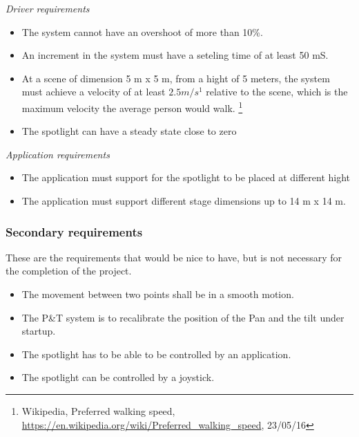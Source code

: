 \textit{Driver requirements}
\begin{itemize}
\item The system cannot have an overshoot of more than 10\%.

\item An increment in the system must have a seteling time of at least 50 mS. 

\item At a scene of dimension 5 m x 5 m, from a hight of 5 meters, the system must achieve a velocity of at least $2.5 m/s^{1}$ relative to the scene, which is the maximum velocity the average person would walk. 
\footnote{Wikipedia, Preferred walking speed, \url{https://en.wikipedia.org/wiki/Preferred_walking_speed}, 23/05/16}

\item The spotlight can have a steady state close to zero
\end{itemize}


\textit{Application requirements}
\begin{itemize}

\item The application must support for the spotlight to be placed at different hight

\item The application must support different stage dimensions up to 14 m x 14 m. 

\end{itemize}


\subsubsection{Secondary requirements}
These are the requirements that would be nice to have, but is not necessary for the completion of the project. 

\begin{itemize}
\item The movement between two points shall be in a smooth motion.

\item The P\&T system is to recalibrate the position of the Pan and the tilt under startup.

\item The spotlight has to be able to be controlled by an application.

\item The spotlight can be controlled by a joystick.
\end{itemize}
